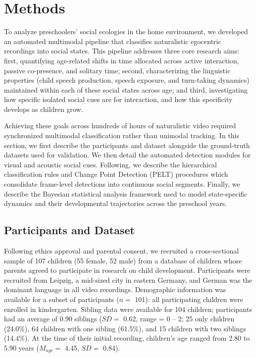 \documentclass[
  english,
  12pt,
  man,floatsintext]{apa6}
\begin{document}
\section{Methods}\label{methodology}

To analyze preschoolers' social ecologies in the home environment, we developed an automated multimodal pipeline that classifies naturalistic egocentric recordings into social states. This pipeline addresses three core research aims: first, quantifying age-related shifts in time allocated across active interaction, passive co-presence, and solitary time; second, characterizing the linguistic properties (child speech production, speech exposure, and turn-taking dynamics) maintained within each of these social states across age; and third, investigating how specific isolated social cues are for interaction, and how this specificity develops as children grow.

Achieving these goals across hundreds of hours of naturalistic video required synchronized multimodal classification rather than unimodal tracking. In this section, we first describe the participants and dataset alongside the ground-truth datasets used for validation. We then detail the automated detection modules for visual and acoustic social cues. Following, we describe the hierarchical classification rules and Change Point Detection (PELT) procedures which consolidate frame-level detections into continuous social segments. Finally, we describe the Bayesian statistical analysis framework used to model state-specific dynamics and their developmental trajectories across the preschool years.

\subsection{Participants and Dataset}\label{participants-dataset}

Following ethics approval and parental consent, we recruited a cross-sectional sample of 107 children (55 female, 52 male) from a database of children whose parents agreed to participate in research on child development. Participants were recruited from Leipzig, a mid-sized city in eastern Germany, and German was the dominant language in all video recordings. Demographic information was available for a subset of participants (\(n=\) 101): all participating children were enrolled in kindergarten. Sibling data were available for 104 children; participants had an average of 0.90 siblings (\(SD =\) 0.62, range = 0 -- 2; 25 only children (24.0\%), 64 children with one sibling (61.5\%), and 15 children with two siblings (14.4\%). At the time of their initial recording, children's age ranged from 2.80 to 5.90 years (\(M_{age}=\) 4.45, \(SD=\) 0.84).
\end{document}
